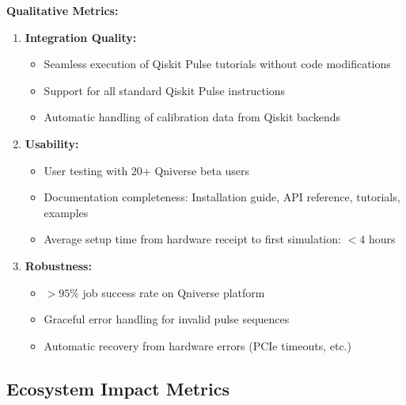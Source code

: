 \documentclass[12pt,a4paper]{article}
\begin{document}
\textbf{Qualitative Metrics:}

\begin{enumerate}[noitemsep]
\item \textbf{Integration Quality:}
   \begin{itemize}[noitemsep]
   \item Seamless execution of Qiskit Pulse tutorials without code modifications
   \item Support for all standard Qiskit Pulse instructions
   \item Automatic handling of calibration data from Qiskit backends
   \end{itemize}

\item \textbf{Usability:}
   \begin{itemize}[noitemsep]
   \item User testing with 20+ Qniverse beta users
   \item Documentation completeness: Installation guide, API reference, tutorials, examples
   \item Average setup time from hardware receipt to first simulation: $<4$ hours
   \end{itemize}

\item \textbf{Robustness:}
   \begin{itemize}[noitemsep]
   \item $>95\%$ job success rate on Qniverse platform
   \item Graceful error handling for invalid pulse sequences
   \item Automatic recovery from hardware errors (PCIe timeouts, etc.)
   \end{itemize}
\end{enumerate}

\subsection{Ecosystem Impact Metrics}
\end{document}
